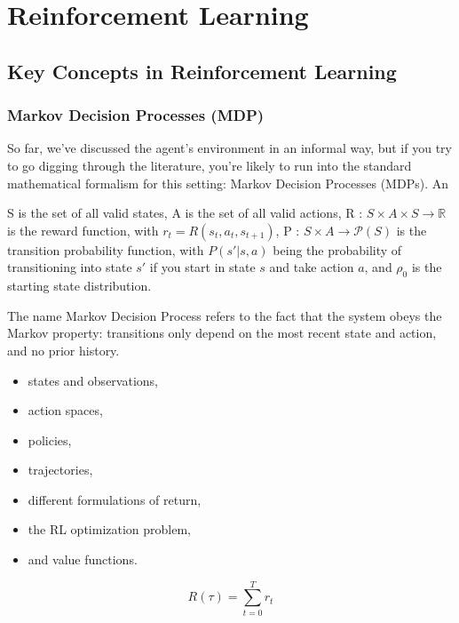 \section{Reinforcement Learning\label{ssec:RL}}

\subsection{Key Concepts in Reinforcement Learning}

\subsubsection{Markov Decision Processes (MDP)}

So far, we’ve discussed the agent’s environment in an informal way, but if you
try to go digging through the literature, you’re likely to run into the standard
mathematical formalism for this setting: Markov Decision Processes (MDPs). An

S is the set of all valid states,
A is the set of all valid actions,
R : $S \times A \times S \to \mathbb{R}$ is the reward function, with $r_t = R(s_t, a_t, s_{t+1})$,
P : $S \times A \to \mathcal{P}(S)$ is the transition probability function, with
$P(s'|s,a)$ being the probability of transitioning into state $s'$ if you start
in state $s$ and take action $a$,
and $\rho_0$ is the starting state distribution.

The name Markov Decision Process refers to the fact that the system obeys the
Markov property: transitions only depend on the most recent state and action,
and no prior history.



\begin{itemize}
    \item states and observations,
    \item action spaces,
    \item policies,
    \item trajectories,
    \item different formulations of return,
    \item the RL optimization problem,
    \item and value functions.
\end{itemize}

\begin{equation}
    R(\tau)=\sum_{t=0}^{T} r_t
\end{equation}

